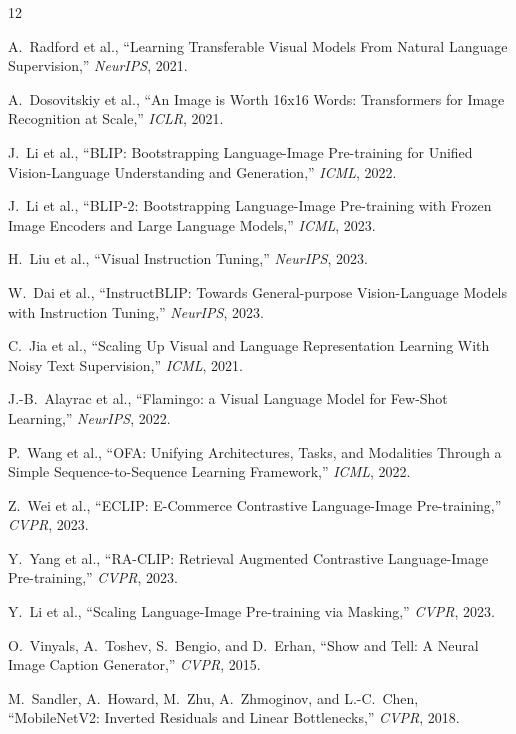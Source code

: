 \documentclass[12pt,a4paper]{article}
\begin{document}

\begin{thebibliography}{12}

A.~Radford et al., ``Learning Transferable Visual Models From Natural Language Supervision,''
\textit{NeurIPS}, 2021.

A.~Dosovitskiy et al., ``An Image is Worth 16x16 Words: Transformers for Image
Recognition at Scale,'' \textit{ICLR}, 2021.

J.~Li et al., ``BLIP: Bootstrapping Language-Image Pre-training for Unified
Vision-Language Understanding and Generation,'' \textit{ICML}, 2022.

J.~Li et al., ``BLIP-2: Bootstrapping Language-Image Pre-training with Frozen
Image Encoders and Large Language Models,'' \textit{ICML}, 2023.

H.~Liu et al., ``Visual Instruction Tuning,'' \textit{NeurIPS}, 2023.

W.~Dai et al., ``InstructBLIP: Towards General-purpose Vision-Language Models
with Instruction Tuning,'' \textit{NeurIPS}, 2023.

C.~Jia et al., ``Scaling Up Visual and Language Representation Learning With
Noisy Text Supervision,'' \textit{ICML}, 2021.

J.-B.~Alayrac et al., ``Flamingo: a Visual Language Model for Few-Shot Learning,''
\textit{NeurIPS}, 2022.

P.~Wang et al., ``OFA: Unifying Architectures, Tasks, and Modalities Through a
Simple Sequence-to-Sequence Learning Framework,'' \textit{ICML}, 2022.

Z.~Wei et al., ``ECLIP: E-Commerce Contrastive Language-Image Pre-training,''
\textit{CVPR}, 2023.

Y.~Yang et al., ``RA-CLIP: Retrieval Augmented Contrastive Language-Image
Pre-training,'' \textit{CVPR}, 2023.

Y.~Li et al., ``Scaling Language-Image Pre-training via Masking,''
\textit{CVPR}, 2023.

O.~Vinyals, A.~Toshev, S.~Bengio, and D.~Erhan, ``Show and Tell: A Neural Image
Caption Generator,'' \textit{CVPR}, 2015.

M.~Sandler, A.~Howard, M.~Zhu, A.~Zhmoginov, and L.-C.~Chen, ``MobileNetV2:
Inverted Residuals and Linear Bottlenecks,'' \textit{CVPR}, 2018.

\end{thebibliography}
\end{document}
